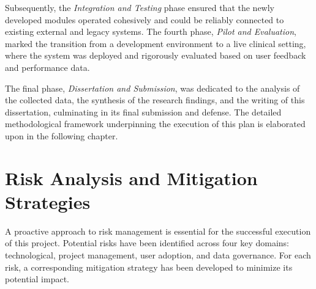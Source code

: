 Subsequently, the \textit{Integration and Testing} phase ensured that the newly developed modules operated cohesively and could be reliably connected to existing external and legacy systems. The fourth phase, \textit{Pilot and Evaluation}, marked the transition from a development environment to a live clinical setting, where the system was deployed and rigorously evaluated based on user feedback and performance data.

The final phase, \textit{Dissertation and Submission}, was dedicated to the analysis of the collected data, the synthesis of the research findings, and the writing of this dissertation, culminating in its final submission and defense. The detailed methodological framework underpinning the execution of this plan is elaborated upon in the following chapter.

\section{Risk Analysis and Mitigation Strategies}
\label{sec:RiskAnalysis}

A proactive approach to risk management is essential for the successful execution of this project. Potential risks have been identified across four key domains: technological, project management, user adoption, and data governance. For each risk, a corresponding mitigation strategy has been developed to minimize its potential impact.

